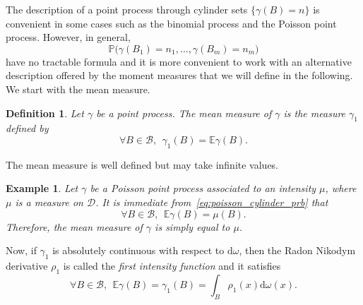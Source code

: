 \documentclass[twoside,11pt]{book}
\newtheorem{definition}{Definition}
\newtheorem{example}{Example}
\numberwithin{theorem}{chapter}
\numberwithin{definition}{chapter}
\numberwithin{proposition}{chapter}
\numberwithin{corollary}{chapter}
\numberwithin{example}{chapter}
\numberwithin{lemma}{chapter}
\numberwithin{assumption}{chapter}
\begin{document}
The description of a point process through cylinder sets $\{ \gamma(B) = n \}$ is convenient in some cases such as the binomial process and the Poisson point process. However, in general,
\begin{equation}
\mathbb{P} \Big(\gamma(B_{1}) = n_{1}, \dots, \gamma(B_{m}) = n_{m} \Big)
\end{equation}
have no tractable formula and it is more convenient to work with an alternative description offered by the moment measures that we will define in the following.
We start with the mean measure.  
\begin{definition}
Let $\gamma$ be a point process. The mean measure of $\gamma$ is the measure $\gamma_{1}$ defined by
\begin{equation}\label{eq:first_intensity_measure}
\forall B \in \mathcal{B}, \:\: \gamma_{1}(B) = \mathbb{E} \gamma(B).
\end{equation}
\end{definition}
The mean measure is well defined but may take infinite values. 
\begin{example}
Let $\gamma$ be a Poisson point process associated to an intensity $\mu$, where $\mu$ is a measure on $\mathcal{D}$. It is immediate from~\eqref{eq:poisson_cylinder_prb} that 
\begin{equation}
\forall B \in \mathcal{B}, \:\: \mathbb{E}\gamma(B) = \mu(B).
\end{equation}
Therefore, the mean measure of $\gamma$ is simply equal to $\mu$.

\end{example}



Now, if $\gamma_{1}$ is absolutely continuous with respect to $\mathrm{d}\omega$, then the Radon Nikodym derivative $\rho_{1}$ is called the \emph{first intensity function} and it satisfies
\begin{equation}\label{eq:first_intensity_function}
\forall B \in \mathcal{B}, \:\:\mathbb{E} \gamma(B) = \gamma_1(B) = \int_{B} \rho_{1}(x) \mathrm{d}\omega(x). 
\end{equation}
\end{document}
